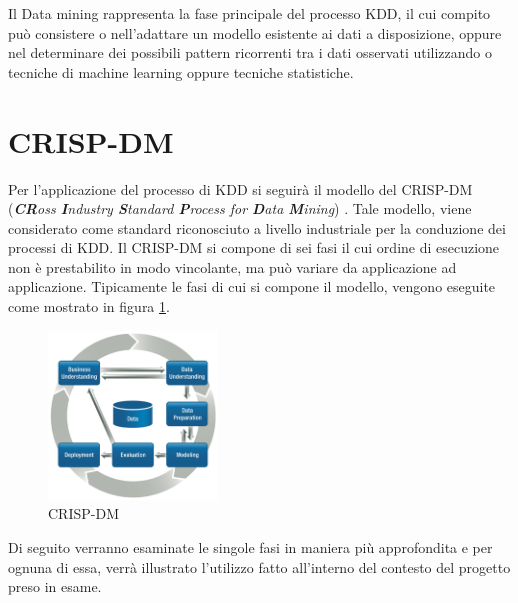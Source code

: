 Il Data mining rappresenta la fase principale del processo KDD, il cui compito può consistere o nell'adattare un modello esistente ai dati a disposizione, oppure nel determinare dei possibili pattern ricorrenti tra i dati osservati utilizzando o tecniche di machine learning oppure tecniche statistiche. 

\section{CRISP-DM}
Per l'applicazione del processo di KDD si seguirà il modello del CRISP-DM (\emph{\textbf{CR}oss \textbf{I}ndustry \textbf{S}tandard \textbf{P}rocess for \textbf{D}ata \textbf{M}ining})
\cite{wirth2000crisp}. Tale modello, viene considerato come standard riconosciuto a livello industriale per la conduzione dei processi di KDD.
Il CRISP-DM si compone di sei fasi il cui ordine di esecuzione non è prestabilito in modo vincolante, ma può variare da applicazione ad applicazione. Tipicamente le fasi di cui si compone il modello, vengono eseguite come mostrato in figura \ref{CRISPDM}.
\begin{figure}[hbtp]
\centering
\includegraphics[width=0.4\textwidth]{./images/CRISPDM.png}
\caption{CRISP-DM}
\label{CRISPDM}
\end{figure}
Di seguito verranno esaminate le singole fasi in maniera più approfondita e per ognuna di essa, verrà illustrato l'utilizzo fatto all'interno del contesto del progetto preso in esame.